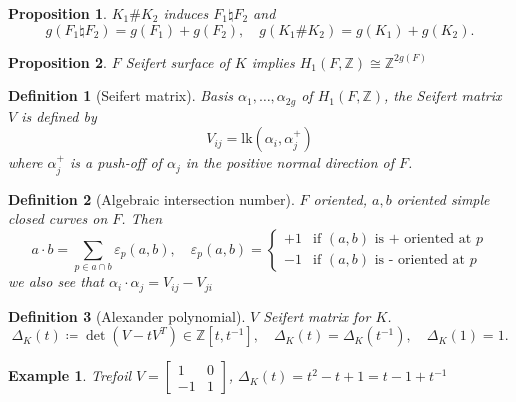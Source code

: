 \documentclass[leqno]{article}
\newtheorem*{proposition}{Proposition}
\newtheorem*{definition}{Definition}
\newtheorem*{example}{Example}
\begin{document}
\begin{proposition} $K_1\# K_2$ induces $F_1\natural F_2$ and 
\[
g(F_1 \natural F_2) = g(F_1) + g(F_2), \quad g(K_1 \# K_2) = g(K_1) + g(K_2).
\]
\end{proposition}

\begin{proposition} $F$ Seifert surface of $K$ implies $H_1(F, \mathbb{Z}) \cong \mathbb{Z}^{2g(F)}$
\end{proposition}

\begin{definition}[Seifert matrix] Basis $\alpha _1, \ldots, \alpha_{2g}$ of $H_1(F, \mathbb{Z})$, the Seifert matrix $V$ is defined by
\[
V_{ij} = \text{lk}(\alpha_i, \alpha_j^+)
\]
where $\alpha_j^+$ is a push-off of $\alpha_j$ in the positive normal direction of $F$.
\end{definition}

\begin{definition}[Algebraic intersection number] $F$ oriented, $a, b$ oriented simple closed curves on $F$. Then
\[
a \cdot b = \sum_{p \in a \cap b} \varepsilon_p(a, b), \quad \varepsilon_p(a, b) = \begin{cases} +1 & \text{if } (a, b) \text{ is + oriented at } p \\ -1 & \text{if } (a, b) \text{ is - oriented at } p \end{cases}
\]
we also see that $\alpha_i \cdot \alpha_j = V_{ij} - V_{ji}$
\end{definition}

\begin{definition}[Alexander polynomial] $V$ Seifert matrix for $K$. 
    \[
\Delta _K(t) \coloneqq  \det (V - t V^T) \in \mathbb{Z}[t, t^{-1}], \quad \Delta_K(t) = \Delta_K(t^{-1}), \quad \Delta_K(1) = 1.
    \]
\end{definition}

\begin{example} Trefoil $V = \begin{bmatrix} 1 & 0 \\ -1 & 1 \end{bmatrix}$, $\Delta_K(t) = t^2 - t + 1 = t-1+t^{-1}$
\end{example}
\end{document}
